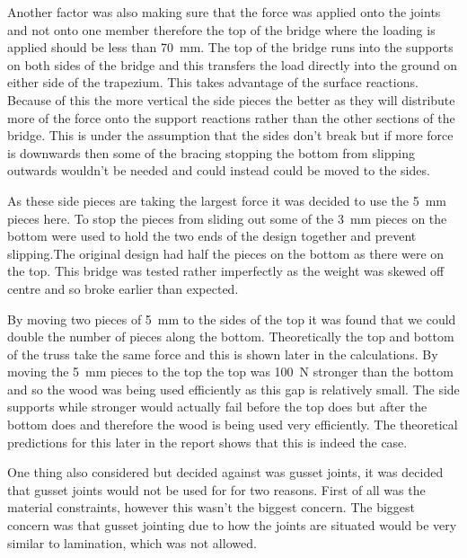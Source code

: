 \documentclass[12pt]{article}
\begin{document}
Another factor was also making sure that the force was applied onto the joints and not onto one member therefore the top of the bridge where the loading is applied should be less than 70~mm. The top of the bridge runs into the supports on both sides of the bridge and this transfers the load directly into the ground on either side of the trapezium. This takes advantage of the surface reactions. Because of this the more vertical the side pieces the better as they will distribute more of the force onto the support reactions rather than the other sections of the bridge. This is under the assumption that the sides don’t break but if more force is downwards then some of the bracing stopping the bottom from slipping outwards wouldn't be needed and could instead could be moved to the sides.  

As these side pieces are taking the largest force it was decided to use the 5~mm pieces here. To stop the pieces from sliding out some of the 3~mm pieces on the bottom were used to hold the two ends of the design together and prevent slipping.The original design had half the pieces on the bottom as there were on the top. This bridge was tested rather imperfectly as the weight was skewed off centre and so broke earlier than expected. 

By moving two pieces of 5~mm to the sides of the top it was found that we could double the number of pieces along the bottom. Theoretically the top and bottom of the truss take the same force and this is shown later in the calculations. By moving the 5~mm pieces to the top the top was 100~N stronger than the bottom and so the wood was being used efficiently as this gap is relatively small. The side supports while stronger would actually fail before the top does but after the bottom does and therefore the wood is being used very efficiently. The theoretical predictions for this later in the report shows that this is indeed the case.

One thing also considered but decided against was gusset joints, it was decided that gusset joints would not be used for for two reasons. First of all was the material constraints, however this wasn't the biggest concern. The biggest concern was that gusset jointing due to how the joints are situated would be very similar to lamination, which was not allowed.
\end{document}
